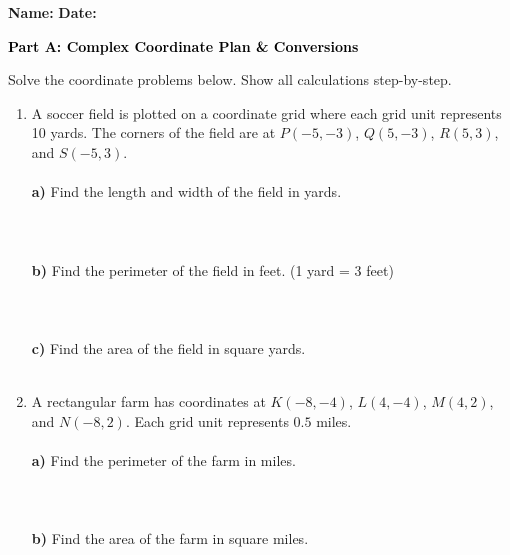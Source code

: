 \documentclass[12pt, letterpaper, fleqn]{article}
\newcommand{\blanklong}{\underline{\hspace{6.5cm}}}
\begin{document}
\textbf{Name:} \underline{\hspace{5cm}}
\hfill
\textbf{Date:} \underline{\hspace{3cm}}\\

\begin{tcolorbox}[colback=black!10]
    \large\textcolor{black}{\textbf{Part A: Complex Coordinate Plan \& Conversions}}
\end{tcolorbox}

\vspace{3mm}

\noindent
Solve the coordinate problems below. Show all calculations step-by-step.

\vspace{5mm}

\begin{enumerate}[itemsep=2cm, leftmargin=0.6cm]
\item A soccer field is plotted on a coordinate grid where each grid unit represents 10 yards. The corners of the field are at $P(-5, -3)$, $Q(5, -3)$, $R(5, 3)$, and $S(-5, 3)$. \\ \\
\textbf{a)} Find the length and width of the field in yards. \\ \\
\blanklong \\ \\
\textbf{b)} Find the perimeter of the field in feet. (1 yard = 3 feet) \\ \\
\blanklong \\ \\ 
\textbf{c)} Find the area of the field in square yards. \\ \\
\blanklong

\item A rectangular farm has coordinates at $K(-8, -4)$, $L(4, -4)$, $M(4, 2)$, and $N(-8, 2)$. Each grid unit represents $0.5$ miles. \\ \\
\textbf{a)} Find the perimeter of the farm in miles. \\ \\
\blanklong \\ \\
\textbf{b)} Find the area of the farm in square miles. \\ \\
\blanklong
\end{enumerate}
\end{document}
